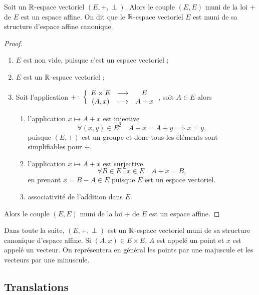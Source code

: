 \begin{prop}
  Soit un \(\mathbb{R}\)-espace vectoriel \((E,+,\perp)\). Alors le couple \((E,E)\) 
  muni de la loi \(+\) de \(E\) est un espace affine. On dit que le 
  \(\mathbb{R}\)-espace vectoriel \(E\) est muni de sa structure d'espace affine 
  canonique.
\end{prop}
\begin{proof}
  \begin{enumerate}
    \item \(E\) est non vide, puisque c'est un espace vectoriel ;
    \item \(E\) est un \(\mathbb{R}\)-espace vectoriel ;
    \item Soit l'application \(+\colon\left\{\begin{array}{ccc}E\times E & \longrightarrow &E\\(A,x) & \longmapsto & A+x\end{array}\right.\), soit 
      \(A \in E\) alors
      \begin{enumerate}
        \item l'application \(x \longmapsto A+x\) est injective
          \begin{equation}
            \forall (x,y) \in E^2 \quad A+x=A+y \implies x=y,
          \end{equation}
          puisque \((E,+)\) est un groupe et donc tous les éléments sont 
          simplifiables pour \(+\).
        \item l'application \(x \longmapsto A+x\) est surjective
          \begin{equation}
            \forall B \in E \ \exists x \in E \quad A+x=B,
          \end{equation}
          en prenant \(x=B-A \in E\) puisque \(E\) est un espace vectoriel.
        \item associativité de l'addition dans \(E\).
      \end{enumerate}
  \end{enumerate}
  Alors le couple \((E,E)\) muni de la loi \(+\) de \(E\) est un espace affine.
\end{proof}

Dans toute la suite, \((E,+,\perp)\) est un \(\mathbb{R}\)-espace vectoriel muni de sa 
structure canonique d'espace affine. Si \((A,x) \in E\times E\), \(A\) est 
appelé un point et \(x\) est appelé un vecteur. On représentera en général les 
points par une majuscule et les vecteurs par une minuscule.

\subsection{Translations}

